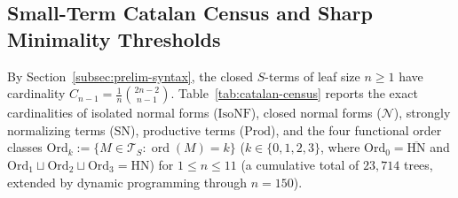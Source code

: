 \documentclass[11pt,reqno]{amsart}
\numberwithin{equation}{section}
\theoremstyle{plain}
\theoremstyle{definition}
\theoremstyle{remark}
\DeclareMathOperator{\ord}{ord}
\newcommand{\TS}{\mathcal{T}_S}
\newcommand{\SN}{\mathrm{SN}}
\newcommand{\HN}{\mathrm{HN}}
\newcommand{\Prod}{\mathrm{Prod}}
\begin{document}
\subsection{Small-Term Catalan Census and Sharp Minimality Thresholds}
\label{subsec:catalan-minimality}

By Section~\ref{subsec:prelim-syntax}, the closed $S$-terms of leaf size $n \ge 1$ have cardinality $C_{n-1} = \frac{1}{n}\binom{2n-2}{n-1}$. Table~\ref{tab:catalan-census} reports the exact cardinalities of isolated normal forms ($\mathrm{IsoNF}$), closed normal forms ($\mathcal{N}$), strongly normalizing terms ($\SN$), productive terms ($\Prod$), and the four functional order classes $\mathrm{Ord}_k := \{ M \in \TS : \ord(M) = k \}$ ($k \in \{0, 1, 2, 3\}$, where $\mathrm{Ord}_0 = \overline{\HN}$ and $\mathrm{Ord}_1 \sqcup \mathrm{Ord}_2 \sqcup \mathrm{Ord}_3 = \HN$) for $1 \le n \le 11$ (a cumulative total of $23{,}714$ trees, extended by dynamic programming through $n = 150$).
\end{document}
